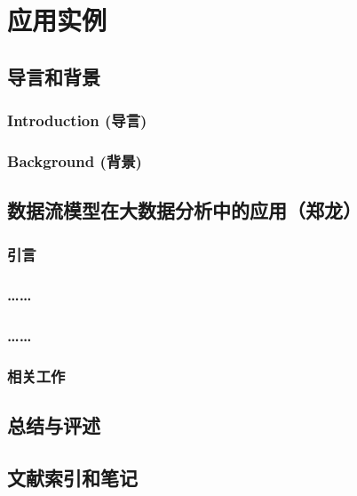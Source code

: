 \chapter{应用实例}\label{chap:application}

\begin{flushleft}  %
\setlength{\parindent}{2em} %

\qquad  

\section{导言和背景}
\subsection{Introduction (导言)}
\subsection{Background (背景)}





\section{数据流模型在大数据分析中的应用（郑龙）}
\subsection{引言}
\subsection{……}
\subsection{……}
\subsection{相关工作}
\section{总结与评述}
\section{文献索引和笔记}


\end{flushleft}
